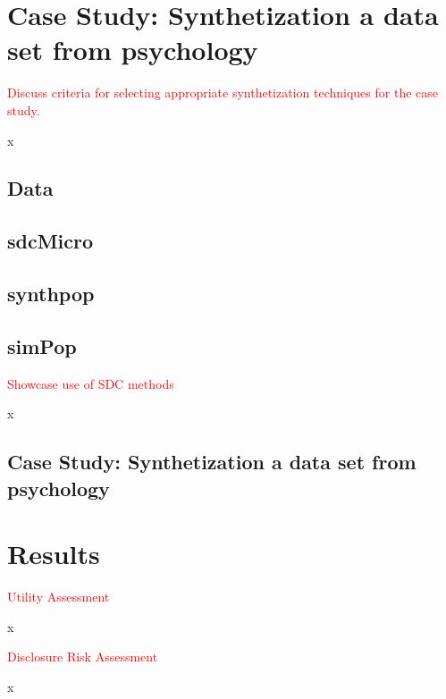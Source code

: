 \documentclass{article}
\begin{document}
\section{Case Study: Synthetization a data set from psychology}

\textcolor{red}{Discuss criteria for selecting appropriate synthetization techniques for the case study.}

x

\subsection{Data}

\subsection{sdcMicro}

\subsection{synthpop}

\subsection{simPop}

\textcolor{red}{Showcase use of SDC methods}

x

\subsection{Case Study: Synthetization a data set from psychology}



\section{Results}

\textcolor{red}{Utility Assessment}

x

\textcolor{red}{Disclosure Risk Assessment}

x

\end{document}
